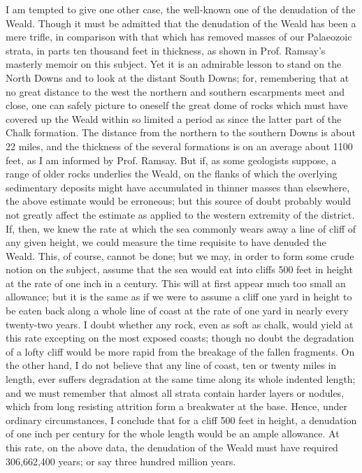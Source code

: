\indent I am tempted to give one other case, the well-known one of the denudation of the Weald. Though it must be admitted that the denudation of the Weald has been a mere trifle, in comparison with that which has removed masses of our Palaeozoic strata, in parts ten thousand feet in thickness, as shown in Prof. Ramsay's masterly memoir on this subject.  Yet it is an admirable lesson to stand on the North Downs and to look at the distant South Downs; for, remembering that at no great distance to the west the northern and southern escarpments meet and close, one can safely picture to oneself the great dome of rocks which must have covered up the Weald within so limited a period as since the latter part of the Chalk formation. The distance from the northern to the southern Downs is about 22 miles, and the thickness of the several formations is on an average about 1100 feet, as I am informed by Prof. Ramsay. But if, as some geologists suppose, a range of older rocks underlies the Weald, on the flanks of which the overlying sedimentary deposits might have accumulated in thinner masses than elsewhere, the above estimate would be erroneous; but this source of doubt probably would not greatly affect the estimate as applied to the western extremity of the district. If, then, we knew the rate at which the sea commonly wears away a line of cliff of any given height, we could measure the time requisite to have denuded the Weald. This, of course, cannot be done; but we may, in order to form some crude notion on the subject, assume that the sea would eat into cliffs 500 feet in height at the rate of one inch in a century. This will at first appear much too small an allowance; but it is the same as if we were to assume a cliff one yard in height to be eaten back along a whole line of coast at the rate of one yard in nearly every twenty-two years. I doubt whether any rock, even as soft as chalk, would yield at this rate excepting on the most exposed coasts; though no doubt the degradation of a lofty cliff would be more rapid from the breakage of the fallen fragments. On the other hand, I do not believe that any line of coast, ten or twenty miles in length, ever suffers degradation at the same time along its whole indented length; and we must remember that almost all strata contain harder layers or nodules, which from long resisting attrition form a breakwater at the base. Hence, under ordinary circumstances, I conclude that for a cliff 500 feet in height, a denudation of one inch per century for the whole length would be an ample allowance. At this rate, on the above data, the denudation of the Weald must have required 306,662,400 years; or say three hundred million years.\\
